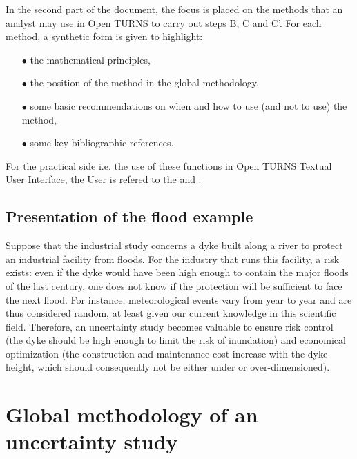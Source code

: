 In the second part of the document, the focus is placed on the methods that an analyst may use in Open TURNS to carry out steps B, C and C'. For each method, a synthetic form is given to highlight:

\begin{itemize}

\item[$\bullet$] the mathematical principles,
\item[$\bullet$] the position of the method in the global methodology,
\item[$\bullet$] some basic recommendations on when and how to use (and not to use) the method,
\item[$\bullet$] some key bibliographic references.

\end{itemize}

For the practical side i.e. the use of these functions in Open TURNS Textual User Interface, the User is refered to the   and .

\subsection{Presentation of the flood example}
\par

Suppose that the industrial study concerns a dyke built along a river to protect an industrial facility from floods. For the industry that runs this facility, a risk exists: even if the dyke would have been high enough to contain the major floods of the last century, one does not know if the protection will be sufficient to face the next flood. For instance, meteorological events vary from year to year and are thus considered random, at least given our current knowledge in this scientific field. Therefore, an uncertainty study becomes valuable to ensure risk control (the dyke should be high enough to limit the risk of inundation) and economical optimization (the construction and maintenance cost increase with the dyke height, which should consequently not be either under or over-dimensioned).

\newpage

\section{Global methodology of an uncertainty study}

